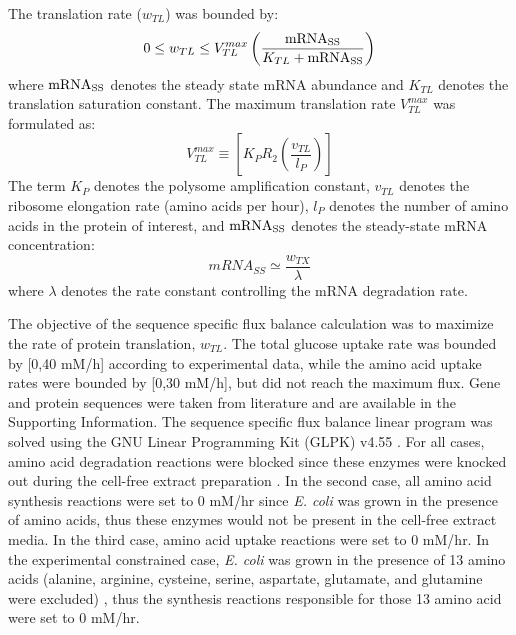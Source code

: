 \documentclass[journal=asbcd6,manuscript=article]{achemso}
\begin{document}
The translation rate ($w_{TL}$) was bounded by:
 \begin{equation}
	0\leq w_{TL} \leq V_{TL}^{max}\left(\frac{\rm mRNA_{SS}}{K_{TL}+\rm mRNA_{SS}}\right)
\end{equation}
where $\rm mRNA_{SS}$ denotes the steady state mRNA abundance and $K_{TL}$ denotes the translation saturation constant.
The maximum translation rate $V_{TL}^{max}$ was formulated as:
\begin{equation}
	V_{TL}^{max} \equiv \left[K_{P} R_{2}\left(\frac{v_{TL}}{l_{P}}\right)\right]
\end{equation}
The term $K_{P}$ denotes the polysome amplification constant,
$v_{TL}$ denotes the ribosome elongation rate (amino acids per hour),
$l_{P}$ denotes the number of amino acids in the protein of interest,
and $\rm mRNA_{SS}$ denotes the steady-state mRNA concentration:
\begin{equation}
	 mRNA_{SS}\simeq\frac{w_{TX}}{\lambda}
\end{equation}
where $\lambda$ denotes the rate constant controlling the mRNA degradation rate.

The objective of the sequence specific flux balance calculation was to maximize the rate of protein translation, $w_{TL}$.
The total glucose uptake rate was bounded by [0,40 mM/h] according to experimental data, while the amino acid uptake rates were bounded by [0,30 mM/h], but did not reach the maximum flux.
Gene and protein sequences were taken from literature and are available in the Supporting Information.
The sequence specific flux balance linear program was solved using the GNU Linear Programming Kit (GLPK) v4.55 \cite{GLPK}.
For all cases, amino acid degradation reactions were blocked since these enzymes were knocked out during the cell-free extract preparation \cite{2005_calhoun_BiotechnologyProgress, Garamella:2016aa}.
In the second case, all amino acid synthesis reactions were set to 0 mM/hr since \textit{E. coli} was grown in the presence of amino acids, thus these enzymes would not be present in the cell-free extract media.
In the third case, amino acid uptake reactions were set to 0 mM/hr.   
In the experimental constrained case, \textit{E. coli} was grown in the presence of 13 amino acids (alanine, arginine, cysteine, serine, aspartate, glutamate, and glutamine were excluded) \cite{Zawada:2003}, thus the synthesis reactions responsible for those 13 amino acid were set to 0 mM/hr.  
\end{document}
